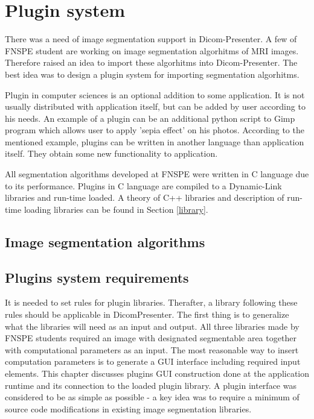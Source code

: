 \chapter{Plugin system}
\vspace{-10mm}

There was a need of image segmentation support in Dicom-Presenter. A few of FNSPE student are working on image segmentation algorhitms of MRI images. Therefore raised an idea to import these algorhitms into Dicom-Presenter. The best idea was to design a plugin system for importing segmentation algorhitms.

Plugin in computer sciences is an optional addition to some application. It is not usually distributed with application itself, but can be added by user according to his needs. An example of a plugin can be an additional python script to Gimp program which allows user to apply 'sepia effect' on his photos. According to the mentioned example, plugins can be written in another language than application itself. They obtain some new functionality to application.

All segmentation algorithms developed at FNSPE were written in C language due to its performance. Plugins in C language are compiled to a Dynamic-Link libraries and run-time loaded. A theory of C++ libraries and description of run-time loading libraries can be found in Section \ref{library}.

\section{Image segmentation algorithms}


\section{Plugins system requirements}

It is needed to set rules for plugin libraries. Therafter, a library following these rules should be applicable in DicomPresenter. The first thing is to generalize what the libraries will need as an input and output. All three libraries made by FNSPE students required an image with designated segmentable area together with computational parameters as an input. The most reasonable way to insert computation parameters is to generate a GUI interface including required input elements. This chapter discusses plugins GUI construction done at the application runtime and its connection to the loaded plugin library. A plugin interface was considered to be as simple as possible - a key idea was to require a minimum of source code modifications in existing image segmentation libraries.

